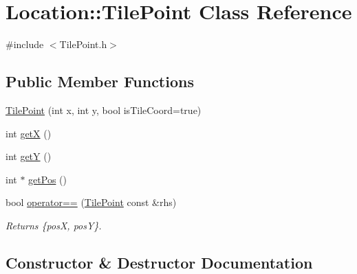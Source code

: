 \hypertarget{classLocation_1_1TilePoint}{}\section{Location\+:\+:Tile\+Point Class Reference}
\label{classLocation_1_1TilePoint}


{\ttfamily \#include $<$Tile\+Point.\+h$>$}

\subsection*{Public Member Functions}
\begin{DoxyCompactItemize}
\item 
\hyperlink{classLocation_1_1TilePoint_afbf1ea90894a760b14728218444b0c81}{Tile\+Point} (int x, int y, bool is\+Tile\+Coord=true)
\item 
int \hyperlink{classLocation_1_1TilePoint_a166b89350a7751f08e8bfbf208da1a52}{getX} ()
\item 
int \hyperlink{classLocation_1_1TilePoint_a8def1dfe482d208f94165a62ee6d8dce}{getY} ()
\item 
int $\ast$ \hyperlink{classLocation_1_1TilePoint_a9d3f1c17f303840aa8a9644959b858ba}{get\+Pos} ()
\item 
bool \hyperlink{classLocation_1_1TilePoint_a1e5bb7ae1c5ac93ee563da915dd0c01b}{operator==} (\hyperlink{classLocation_1_1TilePoint}{Tile\+Point} const \&rhs)
\begin{DoxyCompactList}\small\item\em Returns \{posX, posY\}. \end{DoxyCompactList}\end{DoxyCompactItemize}


\subsection{Constructor \& Destructor Documentation}
